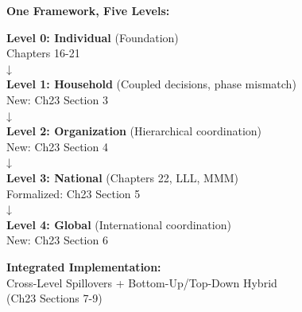 \begin{center}
\textbf{One Framework, Five Levels:} \\
\vspace{0.3cm}

\textbf{Level 0: Individual} (Foundation) \\
Chapters 16-21 \\
↓ \\
\textbf{Level 1: Household} (Coupled decisions, phase mismatch) \\
New: Ch23 Section 3 \\
↓ \\
\textbf{Level 2: Organization} (Hierarchical coordination) \\
New: Ch23 Section 4 \\
↓ \\
\textbf{Level 3: National} (Chapters 22, LLL, MMM) \\
Formalized: Ch23 Section 5 \\
↓ \\
\textbf{Level 4: Global} (International coordination) \\
New: Ch23 Section 6 \\
\vspace{0.5cm}

\textbf{Integrated Implementation:} \\
Cross-Level Spillovers + Bottom-Up/Top-Down Hybrid \\
(Ch23 Sections 7-9)
\end{center}


\newpage
